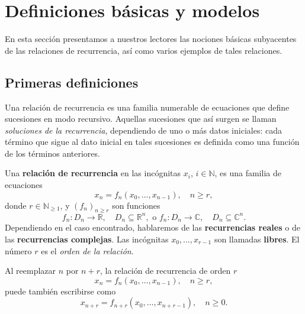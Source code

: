 \section{Definiciones básicas y modelos}

En esta sección presentamos a nuestros lectores las nociones básicas subyacentes de las relaciones de recurrencia, así como varios ejemplos de tales relaciones.

\subsection{Primeras definiciones}

Una relación de recurrencia es una familia numerable de ecuaciones que define sucesiones en modo recursivo. Aquellas sucesiones que así surgen se llaman \emph{soluciones de la recurrencia}, dependiendo de uno o más datos iniciales: cada término que sigue al dato inicial en tales sucesiones es definida como una función de los términos anteriores.

\begin{definition}
	Una \textbf{relación de recurrencia} en las incógnitas $x_{i}$, $i\in\mathds{N}$, es una familia de ecuaciones
		\begin{equation*}
			x_{n}=f_{n}\left(x_{0},\ldots,x_{n-1}\right),\quad n\geq r,
		\end{equation*}
	donde $r\in\mathds{N}_{\geq1}$, y ${\left(f_{n}\right)}_{n\geq r}$ son funciones
		\begin{equation*}
			f_{n}\colon D_{n}\rightarrow\mathds{R},\quad D_{n}\subseteq\mathds{R}^{n},\text{ o }f_{n}\colon D_{n}\rightarrow\mathds{C},\quad D_{n}\subseteq\mathds{C}^{n}.
		\end{equation*}
	Dependiendo en el caso encontrado, hablaremos de las \textbf{recurrencias reales} o de las \textbf{recurrencias complejas}. Las incógnitas $x_{0},\ldots,x_{r-1}$ son llamadas \textbf{libres}. El número $r$ es el \emph{orden de la relación}.

	Al reemplazar $n$ por $n+r$, la relación de recurrencia de orden $r$
		\begin{equation*}
			x_{n}=f_{n}\left(x_{0},\ldots,x_{n-1}\right),\quad n\geq r,
		\end{equation*}
	puede también escribirse como
		\begin{equation*}
			x_{n+r}=f_{n+r}\left(x_{0},\ldots,x_{n+r-1}\right),\quad n\geq0.
		\end{equation*}
\end{definition}

